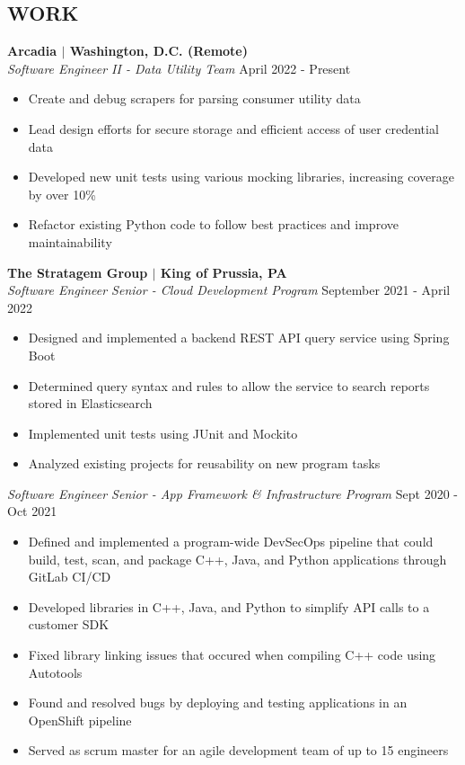 \documentclass[line,resmargin]{res}
\begin{document}
\begin{resume}
\section{WORK}
\textbf{Arcadia $|$ Washington, D.C. (Remote)} \\
{\sl Software Engineer II - Data Utility Team} \hfill April 2022 - Present
\begin{itemize} \itemsep -2pt %
	\item Create and debug scrapers for parsing consumer utility data
	\item Lead design efforts for secure storage and efficient access of user credential data
	\item Developed new unit tests using various mocking libraries, increasing coverage by over 10\%
	\item Refactor existing Python code to follow best practices and improve maintainability
\end{itemize}

\textbf{The Stratagem Group $|$ King of Prussia, PA} \\
{\sl Software Engineer Senior - Cloud Development Program} \hfill September 2021 - April 2022
	\begin{itemize} \itemsep -2pt %
		\item Designed and implemented a backend REST API query service using Spring Boot
		\item Determined query syntax and rules to allow the service to search reports stored in Elasticsearch\
		\item Implemented unit tests using JUnit and Mockito
		\item Analyzed existing projects for reusability on new program tasks
	\end{itemize}

{\sl Software Engineer Senior - App Framework \& Infrastructure Program} \hfill Sept 2020 - Oct 2021
	\begin{itemize} \itemsep -2pt
		\item Defined and implemented a program-wide DevSecOps pipeline that could build, test, scan, and package C++, Java, and Python applications through GitLab CI/CD
		\item Developed libraries in C++, Java, and Python to simplify API calls to a customer SDK
		\item Fixed library linking issues that occured when compiling C++ code using Autotools
		\item Found and resolved bugs by deploying and testing applications in an OpenShift pipeline
		\item Served as scrum master for an agile development team of up to 15 engineers
	\end{itemize}


\end{resume}
\end{document}
